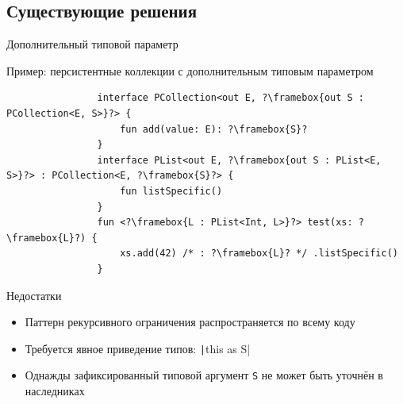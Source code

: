 \documentclass[usenames, dvipsnames]{beamer}
\begin{document}
    \subsection{Существующие решения}

    \begin{frame}[fragile]{Дополнительный типовой параметр}
        \begin{block}{Пример: персистентные коллекции с дополнительным типовым параметром}
            \begin{verbatim}
                interface PCollection<out E, ?\framebox{out S : PCollection<E, S>}?> {
                    fun add(value: E): ?\framebox{S}?
                }
                interface PList<out E, ?\framebox{out S : PList<E, S>}?> : PCollection<E, ?\framebox{S}?> {
                    fun listSpecific()
                }
                fun <?\framebox{L : PList<Int, L>}?> test(xs: ?\framebox{L}?) {
                    xs.add(42) /* : ?\framebox{L}? */ .listSpecific()
                }
            \end{verbatim}
        \end{block}

        \begin{block}{Недостатки}
            \begin{itemize}
                \item Паттерн рекурсивного ограничения распространяется по всему коду
                \item Требуется явное приведение типов: \texttt|this as S|
                \item Однажды зафиксированный типовой аргумент \texttt{S} не может быть уточнён в наследниках
            \end{itemize}
        \end{block}
    \end{frame}
\end{document}
